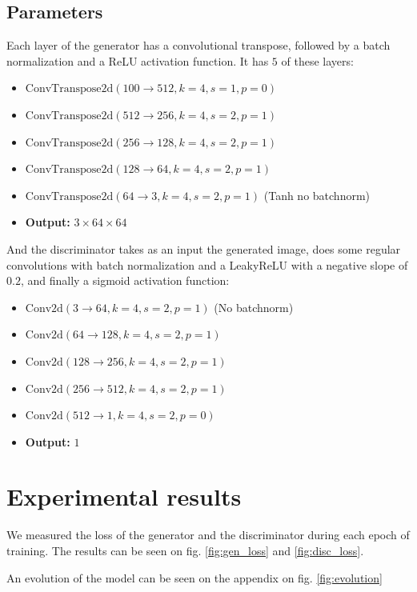 \documentclass[twocolumn]{article}
\begin{document}
\subsection{Parameters}

Each layer of the generator has a convolutional transpose, followed by a batch normalization and a ReLU activation function.
It has $5$ of these layers:
\begin{itemize}
    \item $\text{ConvTranspose2d}(100 \rightarrow 512, k=4, s=1, p=0)$
    \item $\text{ConvTranspose2d}(512 \rightarrow 256, k=4, s=2, p=1)$
    \item $\text{ConvTranspose2d}(256 \rightarrow 128, k=4, s=2, p=1)$
    \item $\text{ConvTranspose2d}(128 \rightarrow 64, k=4, s=2, p=1)$
    \item $\text{ConvTranspose2d}(64 \rightarrow 3, k=4, s=2, p=1)$ (Tanh no batchnorm)
    \item \textbf{Output: }$3 \times 64 \times 64$
\end{itemize}
And the discriminator takes as an input the generated image, does some regular convolutions with batch normalization and a LeakyReLU with a negative slope of $0.2$, and finally
a sigmoid activation function:
\begin{itemize}
    \item $\text{Conv2d}(3 \rightarrow 64, k=4, s=2, p=1)$ (No batchnorm)
    \item $\text{Conv2d}(64 \rightarrow 128, k=4, s=2, p=1)$
    \item $\text{Conv2d}(128 \rightarrow 256, k=4, s=2, p=1)$
    \item $\text{Conv2d}(256 \rightarrow 512, k=4, s=2, p=1)$
    \item $\text{Conv2d}(512 \rightarrow 1, k=4, s=2, p=0)$
    \item \textbf{Output: }$1$
\end{itemize}

\section{Experimental results}

We measured the loss of the generator and the discriminator during each epoch of training. The results can be seen on fig. \ref{fig:gen_loss} and \ref{fig:disc_loss}.

An evolution of the model can be seen on the appendix on fig. \ref{fig:evolution}
\end{document}
